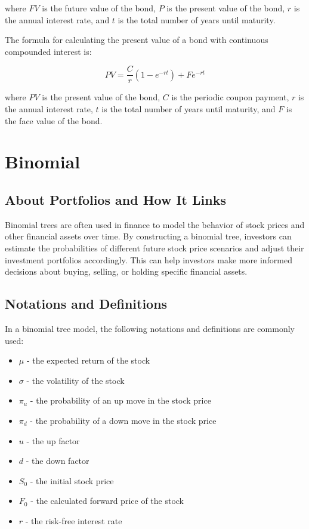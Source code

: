 \documentclass{article}
\theoremstyle{mytheoremstyle}
\theoremstyle{mytheoremstyle}
\theoremstyle{myproblemstyle}
\begin{document}
where $FV$ is the future value of the bond, $P$ is the present value of the bond, $r$ is the annual interest rate, and $t$ is the total number of years until maturity.

The formula for calculating the present value of a bond with continuous compounded interest is:

\begin{equation}
PV = \frac{C}{r} \left( 1 - e^{-rt} \right) + Fe^{-rt}
\end{equation}

where $PV$ is the present value of the bond, $C$ is the periodic coupon payment, $r$ is the annual interest rate, $t$ is the total number of years until maturity, and $F$ is the face value of the bond.



\section{Binomial}

\subsection{About Portfolios and How It Links}
Binomial trees are often used in finance to model the behavior of stock prices and other financial assets over time. By constructing a binomial tree, investors can estimate the probabilities of different future stock price scenarios and adjust their investment portfolios accordingly. This can help investors make more informed decisions about buying, selling, or holding specific financial assets.

\subsection{Notations and Definitions}
In a binomial tree model, the following notations and definitions are commonly used:

\begin{itemize}
\item $\mu$ - the expected return of the stock
\item $\sigma$ - the volatility of the stock
\item $\pi_u$ - the probability of an up move in the stock price
\item $\pi_d$ - the probability of a down move in the stock price
\item $u$ - the up factor
\item $d$ - the down factor
\item $S_0$ - the initial stock price
\item $F_0$ - the calculated forward price of the stock
\item $r$ - the risk-free interest rate
\end{itemize}
\end{document}
